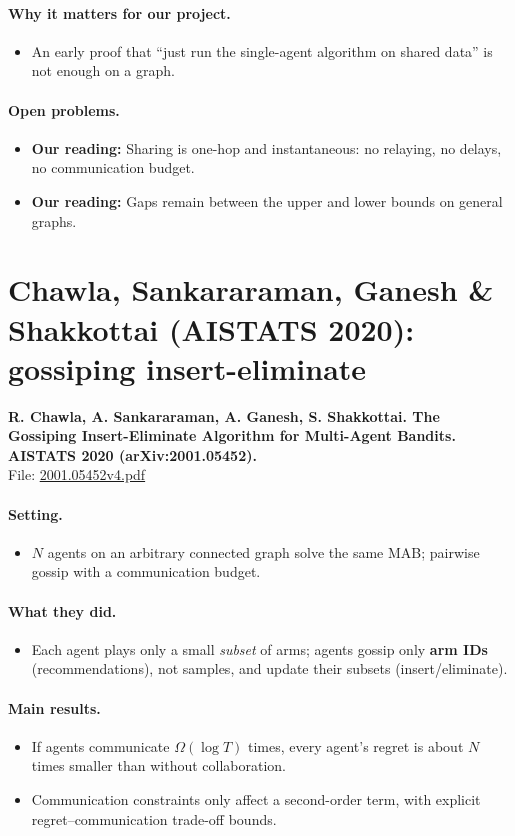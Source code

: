 \documentclass[11pt]{article}
\newcommand{\ours}{\textcolor{orange!80!black}{\textbf{Our reading:}}}
\newcommand{\file}[1]{\url{#1}}
\begin{document}
\paragraph{Why it matters for our project.}
\begin{itemize}\item An early proof that ``just run the single-agent algorithm on shared data'' is not enough on a graph.\end{itemize}
\paragraph{Open problems.}
\begin{itemize}\item \ours{} Sharing is one-hop and instantaneous: no relaying, no delays, no communication budget.\item \ours{} Gaps remain between the upper and lower bounds on general graphs.\end{itemize}
\section{Chawla, Sankararaman, Ganesh \& Shakkottai (AISTATS 2020): gossiping insert-eliminate}
\textbf{R. Chawla, A. Sankararaman, A. Ganesh, S. Shakkottai. The Gossiping Insert-Eliminate Algorithm for Multi-Agent Bandits. AISTATS 2020 (arXiv:2001.05452).}\\ File: \file{2001.05452v4.pdf}
\paragraph{Setting.}
\begin{itemize}\item $N$ agents on an arbitrary connected graph solve the same MAB; pairwise gossip with a communication budget.\end{itemize}
\paragraph{What they did.}
\begin{itemize}\item Each agent plays only a small \emph{subset} of arms; agents gossip only \textbf{arm IDs} (recommendations), not samples, and update their subsets (insert/eliminate).\end{itemize}
\paragraph{Main results.}
\begin{itemize}\item If agents communicate $\Omega(\log T)$ times, every agent's regret is about $N$ times smaller than without collaboration.\item Communication constraints only affect a second-order term, with explicit regret--communication trade-off bounds.\end{itemize}
\end{document}
